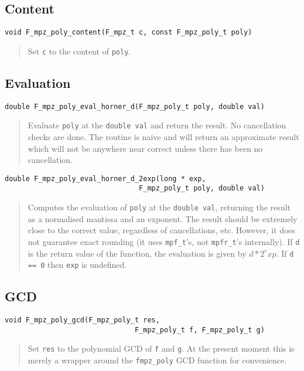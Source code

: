 \documentclass[a4paper,10pt]{article}
\newcommand{\code}{\lstinline}
\begin{document}
\subsection{Content}

\begin{lstlisting}
void F_mpz_poly_content(F_mpz_t c, const F_mpz_poly_t poly)
\end{lstlisting}
\begin{quote}
Set \code{c} to the content of \code{poly}.
\end{quote}

\subsection{Evaluation}

\begin{lstlisting}
double F_mpz_poly_eval_horner_d(F_mpz_poly_t poly, double val)
\end{lstlisting}
\begin{quote}
Evaluate \code{poly} at the \code{double val} and return the result. No cancellation checks are done. 
The routine is naive and will return an approximate result which will not be anywhere near correct 
unless there has been no cancellation.
\end{quote}

\begin{lstlisting}
double F_mpz_poly_eval_horner_d_2exp(long * exp, 
                                F_mpz_poly_t poly, double val)
\end{lstlisting}
\begin{quote}
Computes the evaluation of \code{poly} at the \code{double val}, returning the result as a normalised 
mantissa and an exponent. The result should be extremely close to the correct value, regardless of 
cancellations, etc. However, it does not guarantee exact rounding (it uses \code{mpf_t}'s, not 
\code{mpfr_t}'s internally). If \code{d} is the return value of the function, the evaluation is given 
by $d*2^exp$. If \code{d == 0} then \code{exp} is undefined.
\end{quote}

\subsection{GCD}

\begin{lstlisting}
void F_mpz_poly_gcd(F_mpz_poly_t res, 
                               F_mpz_poly_t f, F_mpz_poly_t g)
\end{lstlisting}
\begin{quote}
Set \code{res} to the polynomial GCD of \code{f} and \code{g}. At the present moment this is merely
a wrapper around the \code{fmpz_poly} GCD function for convenience.
\end{quote}
\end{document}
